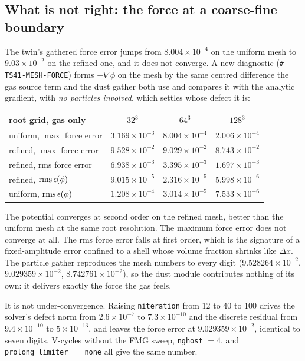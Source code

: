 \documentclass[11pt]{article}
\newcommand{\code}[1]{\texttt{#1}}
\begin{document}
\subsection{What is not right: the force at a coarse-fine boundary}
\label{sec:gravsmr-interface}

The twin's gathered force error jumps from $8.004\times10^{-4}$ on the uniform mesh to
$9.03\times10^{-2}$ on the refined one, and it does not converge. A new diagnostic
(\code{\# TS41-MESH-FORCE}) forms $-\nabla\phi$ on the mesh by the same centred
difference the gas source term and the dust gather both use and compares it with the
analytic gradient, with \emph{no particles involved}, which settles whose defect it is:

\begin{center}
\small
\begin{tabular}{@{}lccc@{}}
\toprule
root grid, gas only & $32^3$ & $64^3$ & $128^3$ \\
\midrule
uniform, $\max$ force error      & $3.169\times10^{-3}$ & $8.004\times10^{-4}$ & $2.006\times10^{-4}$ \\
refined, $\max$ force error      & $9.528\times10^{-2}$ & $9.029\times10^{-2}$ & $8.743\times10^{-2}$ \\
refined, rms force error         & $6.938\times10^{-3}$ & $3.395\times10^{-3}$ & $1.697\times10^{-3}$ \\
refined, ${\rm rms}\,\epsilon(\phi)$ & $9.015\times10^{-5}$ & $2.316\times10^{-5}$ & $5.998\times10^{-6}$ \\
uniform, ${\rm rms}\,\epsilon(\phi)$ & $1.208\times10^{-4}$ & $3.014\times10^{-5}$ & $7.533\times10^{-6}$ \\
\bottomrule
\end{tabular}
\end{center}

The potential converges at second order on the refined mesh, better than the uniform mesh
at the same root resolution. The maximum force error does not converge at all. The rms
force error falls at first order, which is the signature of a fixed-amplitude error
confined to a shell whose volume fraction shrinks like $\Delta x$. The particle gather
reproduces the mesh numbers to every digit ($9.528264\times10^{-2}$,
$9.029359\times10^{-2}$, $8.742761\times10^{-2}$), so the dust module contributes nothing
of its own: it delivers exactly the force the gas feels.

It is not under-convergence. Raising \code{niteration} from 12 to 40 to 100 drives the
solver's defect norm from $2.6\times10^{-7}$ to $7.3\times10^{-10}$ and the discrete
residual from $9.4\times10^{-10}$ to $5\times10^{-13}$, and leaves the force error at
$9.029359\times10^{-2}$, identical to seven digits. V-cycles without the FMG sweep,
\code{nghost} $= 4$, and \code{prolong\_limiter} $=$ \code{none} all give the same number.
\end{document}
